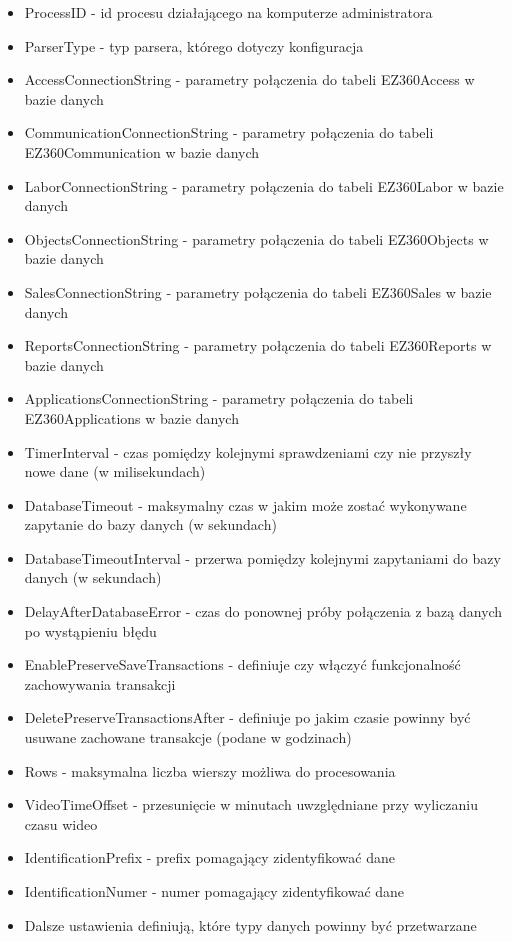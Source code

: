 \documentclass[a4paper]{book}
\begin{document}
\begin{itemize}
	\item ProcessID - id procesu działającego na komputerze administratora
	\item ParserType - typ parsera, którego dotyczy konfiguracja
	\item AccessConnectionString - parametry połączenia do tabeli EZ360Access w bazie danych
	\item CommunicationConnectionString - parametry połączenia do tabeli EZ360Communication w bazie danych
	\item LaborConnectionString - parametry połączenia do tabeli EZ360Labor w bazie danych
	\item ObjectsConnectionString - parametry połączenia do tabeli EZ360Objects w bazie danych
	\item SalesConnectionString - parametry połączenia do tabeli EZ360Sales w bazie danych
	\item ReportsConnectionString - parametry połączenia do tabeli EZ360Reports w bazie danych
	\item ApplicationsConnectionString - parametry połączenia do tabeli EZ360Applications w bazie danych
	\item TimerInterval - czas pomiędzy kolejnymi sprawdzeniami czy nie przyszły nowe dane (w milisekundach)
	\item DatabaseTimeout - maksymalny czas w jakim może zostać wykonywane zapytanie do bazy danych (w sekundach)
	\item DatabaseTimeoutInterval - przerwa pomiędzy kolejnymi zapytaniami do bazy danych (w sekundach)
	\item DelayAfterDatabaseError - czas do ponownej próby połączenia z bazą danych po wystąpieniu błędu
	\item EnablePreserveSaveTransactions - definiuje czy włączyć funkcjonalność zachowywania transakcji
	\item DeletePreserveTransactionsAfter - definiuje po jakim czasie powinny być usuwane zachowane transakcje (podane w godzinach) 
	\item Rows - maksymalna liczba wierszy możliwa do procesowania
	\item VideoTimeOffset - przesunięcie w minutach uwzględniane przy wyliczaniu czasu wideo
	\item IdentificationPrefix - prefix pomagający zidentyfikować dane
	\item IdentificationNumer - numer pomagający zidentyfikować dane
	\item Dalsze ustawienia definiują, które typy danych powinny być przetwarzane
\end{itemize}
\end{document}
